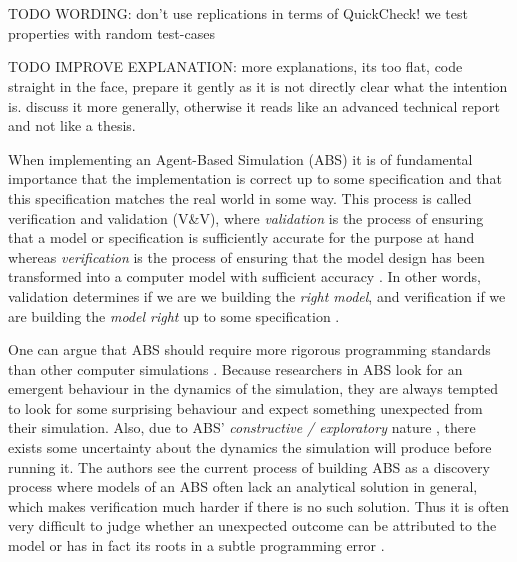 \chapter*{} %
\label{ch:property}

TODO WORDING: don't use replications in terms of QuickCheck! we test properties with random test-cases

TODO IMPROVE EXPLANATION: more explanations, its too flat, code straight in the face, prepare it gently as it is not directly clear what the intention is. discuss it more generally, otherwise it reads like an advanced technical report and not like a thesis.

When implementing an Agent-Based Simulation (ABS) it is of fundamental importance that the implementation is correct up to some specification and that this specification matches the real world in some way. This process is called verification and validation (V\&V), where \textit{validation} is the process of ensuring that a model or specification is sufficiently accurate for the purpose at hand whereas \textit{verification} is the process of ensuring that the model design has been transformed into a computer model with sufficient accuracy \cite{robinson_simulation:_2014}. In other words, validation determines if we are we building the \textit{right model}, and verification if we are building the \textit{model right} up to some specification \cite{balci_verification_1998}.

One can argue that ABS should require more rigorous programming standards than other computer simulations \cite{polhill_ghost_2005}. Because researchers in ABS look for an emergent behaviour in the dynamics of the simulation, they are always tempted to look for some surprising behaviour and expect something unexpected from their simulation. 
Also, due to ABS' \textit{constructive / exploratory} nature \cite{epstein_chapter_2006, epstein_generative_2012}, there exists some uncertainty about the dynamics the simulation will produce before running it. The authors \cite{ormerod_validation_2006} see the current process of building ABS as a discovery process where models of an ABS often lack an analytical solution in general, which makes verification much harder if there is no such solution. Thus it is often very difficult to judge whether an unexpected outcome can be attributed to the model or has in fact its roots in a subtle programming error \cite{galan_errors_2009}.

